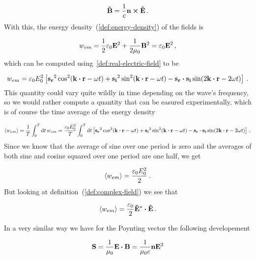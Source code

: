 \documentclass[12pt, class=report, crop=false]{standalone}
\begin{document}
\begin{equation}
  \label{othogonality-of-fields}
  \vb{\tilde{B}} = \frac{1}{c} \vb{n}\cp\vb{\tilde{E}} \,.
\end{equation}
With this, the energy density~(\ref{def:energy-density}) of the fields is

\begin{equation}
  w_{em} = \frac{1}{2} \varepsilon_0 \vb{E}^2+ \frac{1}{2\mu_0} \vb{B}^2 = \varepsilon_0 \vb{E}^2 \,,
\end{equation}
which can be computed using~\cref{def:real-electric-field} to be

\begin{equation}
  w_{em} = \varepsilon_0 E_{0}^{2} \left[ \vb{s_r}^2 \cos[2](\vb{k}\vdot\vb{r}-\omega t) + \vb{s_i}^2 \sin[2](\vb{k}\vdot\vb{r}-\omega t) - \vb{s_r}\vdot\vb{s_i} \sin(2\vb{k}\vdot \vb{r} - 2 \omega t) \right] \,.
\end{equation}
This quantity could vary quite wildly in time depending on the wave's frequency, so we would rather compute a quantity that can be easured experimentally, which is of course the time average of the energy density

\begin{equation}
  \expval{w_{em}} = \frac{1}{T} \int_{0}^{T} \dd{t} w_{em} = \frac{\varepsilon_0 E_0^2}{T} \int_{0}^{T} \dd{t} \left[ \vb{s_r}^2 \cos[2](\vb{k}\vdot\vb{r}-\omega t) + \vb{s_i}^2 \sin[2](\vb{k}\vdot\vb{r}-\omega t) - \vb{s_r}\vdot\vb{s_i} \sin(2\vb{k}\vdot \vb{r} - 2 \omega t) \right] \,.
\end{equation}
Since we know that the average of sine over one period is zero and the averages of both sine and cosine squared over one period are one half, we get

\begin{equation}
  \expval{w_{em}} = \frac{\varepsilon_0 E_0^2}{2} \,.
\end{equation}
But looking at definition~(\ref{def:complex-field}) we see that

\begin{equation}
  \expval{w_{em}} = \frac{\varepsilon_0}{2} \vb{\tilde{E}^*} \vdot \vb{\tilde{E}} \,.
\end{equation}

\par
In a very similar way we have for the Poynting vector the following developement

\begin{equation}
  \vb{S} = \frac{1}{\mu_0} \vb{E}\vdot\vb{B} = \frac{1}{\mu_0 c} \vb{n} \vb{E}^2
\end{equation}
\end{document}
